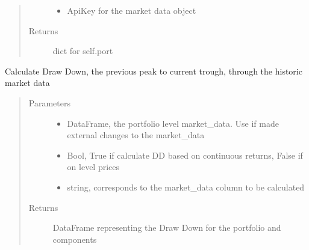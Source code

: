\documentclass[letterpaper,10pt,english]{sphinxmanual}
\begin{document}
\begin{fulllineitems}
\begin{fulllineitems}
\begin{quote}
\begin{description}
\begin{itemize}
\item {} 
\sphinxAtStartPar
{} \textendash{} ApiKey for the market data object

\end{itemize}

\item[{Returns}] \leavevmode
\sphinxAtStartPar
dict for self.port

\end{description}\end{quote}

\end{fulllineitems}


\begin{fulllineitems}
\label{\detokenize{securities:risk_dash.securities.Portfolio.drawdown}}
\sphinxAtStartPar
Calculate Draw Down, the previous peak to current trough, through the historic market data
\begin{quote}\begin{description}
\item[{Parameters}] \leavevmode\begin{itemize}
\item {} 
\sphinxAtStartPar
{} \textendash{} DataFrame, the portfolio level market\_data. Use if made external changes to the market\_data

\item {} 
\sphinxAtStartPar
{} \textendash{} Bool, True if calculate DD based on continuous returns, False if on level prices

\item {} 
\sphinxAtStartPar
{} \textendash{} string, corresponds to the market\_data column to be calculated

\end{itemize}

\item[{Returns}] \leavevmode
\sphinxAtStartPar
DataFrame representing the Draw Down for the portfolio and components


\end{description}
\end{quote}
\end{fulllineitems}
\end{fulllineitems}
\end{document}
